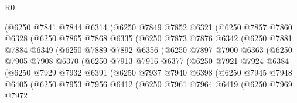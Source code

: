 \begin{lexlean}{R0}
\begin{coremodule}
                (@6250
                  @7841
                  @7844
                  @6314
                  (@6250
                    @7849
                    @7852
                    @6321
                    (@6250
                      @7857
                      @7860
                      @6328
                      (@6250
                        @7865
                        @7868
                        @6335
                        (@6250
                          @7873
                          @7876
                          @6342
                          (@6250
                            @7881
                            @7884
                            @6349
                            (@6250
                              @7889
                              @7892
                              @6356
                              (@6250
                                @7897
                                @7900
                                @6363
                                (@6250
                                  @7905
                                  @7908
                                  @6370
                                  (@6250
                                    @7913
                                    @7916
                                    @6377
                                    (@6250
                                      @7921
                                      @7924
                                      @6384
                                      (@6250
                                        @7929
                                        @7932
                                        @6391
                                        (@6250
                                          @7937
                                          @7940
                                          @6398
                                          (@6250
                                            @7945
                                            @7948
                                            @6405
                                            (@6250
                                              @7953
                                              @7956
                                              @6412
                                              (@6250
                                                @7961
                                                @7964
                                                @6419
                                                (@6250
                                                  @7969
                                                  @7972

\end{coremodule}
\end{lexlean}
